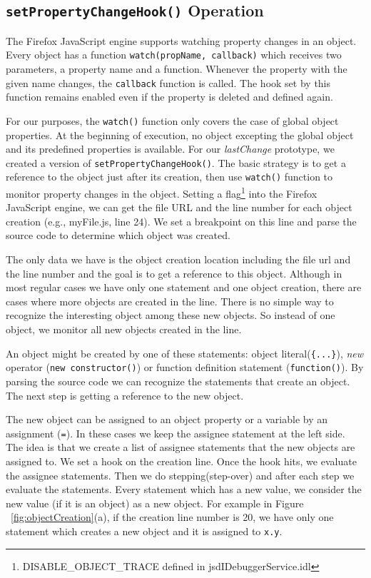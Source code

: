 \documentclass{sig-alternate}
\begin{document}
\subsection{{\normalsize\bf\texttt{setPropertyChangeHook()}} Operation}
The Firefox JavaScript engine supports watching property changes in an
object. Every object has a function \texttt{watch(propName, callback)}
which receives two parameters, a property name and a function.  Whenever
the property with the given name changes, the \texttt{callback} function is
called. The hook set by this function remains enabled even if the
property is deleted and defined again. 

For our purposes, the \texttt{watch()} function only covers the case
of global object properties. At the beginning of execution, no object
excepting the global object and its predefined properties is available.  For 
our \textit{lastChange} prototype, we created a version of
\texttt{setPropertyChangeHook()}.  The basic strategy is to get a reference to the object just
after its creation, then use \texttt{watch()} function to monitor
property changes in the object. Setting a flag\footnote[3]{DISABLE\_OBJECT\_TRACE defined in jsdIDebuggerService.idl} into the Firefox 
JavaScript engine, we can get the file URL and the line number for each object
creation (e.g., myFile.js, line 24). We set a breakpoint on this line
and parse the source code to determine which object was created.

The only data we have is the object creation location including the
file url and the line number and the goal is to get a reference to
this object. Although in most regular cases we have only one
statement and one object creation, there are cases where more
objects are created in the line. There is no simple way to
recognize the interesting object among these new objects. So instead
of one object, we monitor all new objects created in the line.

An object might be created by one of these statements: object
literal(\texttt{\{...\}}), \textit{new} operator (\texttt{new 
constructor()}) or function definition statement (\texttt{function()}). 
By parsing the source code we can recognize the statements that
create an object. The next step is getting a reference to the new object.

The new object can be assigned to an object property or a variable by
an assignment (\texttt{=}). In these cases we keep the assignee statement 
at the left side. The idea is that we create a list of assignee statements 
that the new objects are assigned to. We set a hook on the creation
line. Once the hook hits, we evaluate the assignee statements. Then 
we do stepping(step-over) and after each step we evaluate the
statements. Every statement which has a new value, we consider the new
value (if it is an object) as a new object. For example in Figure
~\ref{fig:objectCreation}(a), if the creation line number is 20, we
have only one statement which creates a new object and it is assigned
to \texttt{x.y}.
\end{document}
